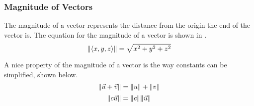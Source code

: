 \subsubsection{Magnitude of Vectors}\label{subsubsec:Vector_Magnitude}
The magnitude of a vector represents the distance from the origin the end of the vector is.
The equation for the magnitude of a vector is shown in .
\begin{equation}\label{eq:Vector_Magnitude}
  \lVert \langle x, y, z \rangle \rVert = \sqrt{x^{2} + y^{2} + z^{2}}
\end{equation}

A nice property of the magnitude of a vector is the way constants can be simplified, shown below.
\begin{equation*}
  \lVert \vec{u} + \vec{v} \rVert = \lVert u \rVert + \lVert v \rVert
\end{equation*}
\begin{equation*}
  \lVert c \vec{u} \rVert = \lVert c \rVert \lVert \vec{u} \rVert
\end{equation*}

